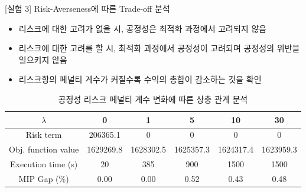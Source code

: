 \documentclass[xcolor=dvipsnames,t,9pt]{beamer}
\begin{document}

\begin{frame}{[실험 3] Risk-Averseness에 따른 Trade-off 분석}
    \begin{block}{}
    \begin{itemize}
        \item 리스크에 대한 고려가 없을 시, 공정성은 최적화 과정에서 고려되지 않음
        \item 리스크에 대한 고려를 할 시, 최적화 과정에서 공정성이 고려되며 공정성의 위반을 일으키지 않음
        \item 리스크항의 페널티 계수가 커질수록 수익의 총합이 감소하는 것을 확인
    \end{itemize}
    \end{block}


    \begin{table}[]
        \footnotesize
        \caption{공정성 리스크 페널티 계수 변화에 따른 상충 관계 분석}
        \vspace{-0.5em}
        \begin{tabular}{cccccc}
            \toprule
            $\lambda$           & 0 & 1 & 5 & 10 & 30 \\ \midrule
            Risk term           & 206365.1 & 0  & 0  & 0   & 0     \\
            Obj. function value & 1629269.8 & 1628302.5  & 1625357.3  & 1624317.4   & 1623959.3    \\ \midrule
            Execution time (s)     & 20  & 385  & 900  & 1500  & 1500  \\ 
            MIP Gap (\%)     & 0.00  & 0.00  & 0.52  & 0.43  & 0.48  \\ \bottomrule
        \end{tabular}
    \end{table}

\end{frame}

\end{document}
